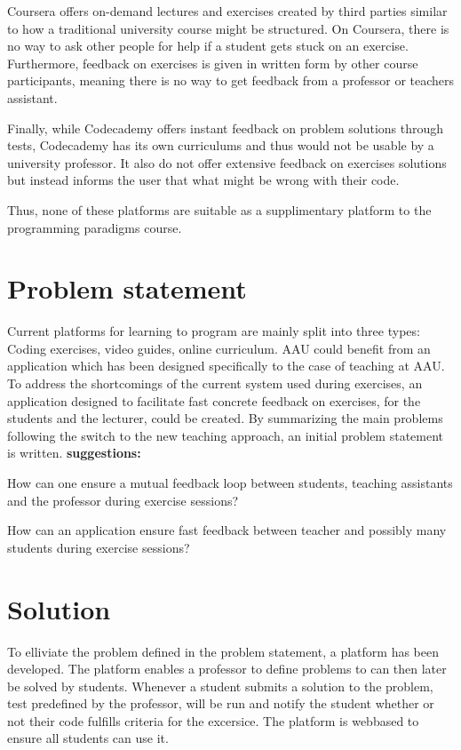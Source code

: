 Coursera offers on-demand lectures and exercises created by third parties similar to how a traditional university course might be structured.
On Coursera, there is no way to ask other people for help if a student gets stuck on an exercise.
Furthermore, feedback on exercises is given in written form by other course participants, meaning there is no way to get feedback from a professor or teachers assistant. 


Finally, while Codecademy offers instant feedback on problem solutions through tests, Codecademy has its own curriculums and thus would not be usable by a university professor. 
It also do not offer extensive feedback on exercises solutions but instead informs the user that what might be wrong with their code. 


Thus, none of these platforms are suitable as a supplimentary platform to the programming paradigms course. 
\section{Problem statement}
Current platforms for learning to program are mainly split into three types: Coding exercises, video guides, online curriculum. 
AAU could benefit from an application which has been designed specifically to the case of teaching at AAU.
To address the shortcomings of the current system used during exercises, an application designed to facilitate fast concrete feedback on exercises, for the students and the lecturer, could be created.
By summarizing the main problems following the switch to the new teaching approach, an initial problem statement is written.
\textbf{suggestions:}
\begin{displayquote}
How can one ensure a mutual feedback loop between students, teaching assistants and the professor during exercise sessions?
\end{displayquote} 

\begin{displayquote}
    How can an application ensure fast feedback between teacher and possibly many students during exercise sessions?
\end{displayquote} 

\section{Solution}
To elliviate the problem defined in the problem statement, a platform has been developed.
The platform enables a professor to define problems to can then later be solved by students.
Whenever a student submits a solution to the problem, test predefined by the professor, will be run and notify the student whether or not their code fulfills criteria for the excersice. 
The platform is webbased to ensure all students can use it.